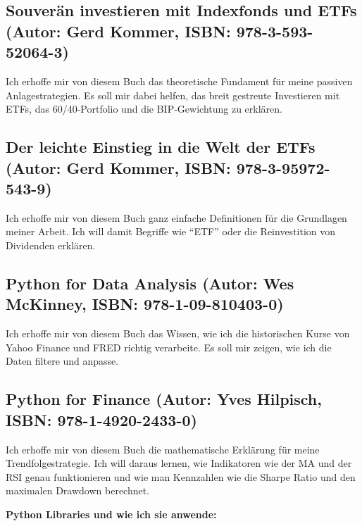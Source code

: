 \documentclass[
  ngerman,
  a4paper,
  DIV=11,
  oneside]{scrreprt}
\begin{document}
\subsection{Souverän investieren mit Indexfonds und ETFs (Autor: Gerd
Kommer, ISBN:
978-3-593-52064-3)}\label{souveruxe4n-investieren-mit-indexfonds-und-etfs-autor-gerd-kommer-isbn-978-3-593-52064-3}

Ich erhoffe mir von diesem Buch das theoretische Fundament für meine
passiven Anlagestrategien. Es soll mir dabei helfen, das breit gestreute
Investieren mit ETFs, das 60/40-Portfolio und die BIP-Gewichtung zu
erklären.

\subsection{Der leichte Einstieg in die Welt der ETFs (Autor: Gerd
Kommer, ISBN:
978-3-95972-543-9)}\label{der-leichte-einstieg-in-die-welt-der-etfs-autor-gerd-kommer-isbn-978-3-95972-543-9}

Ich erhoffe mir von diesem Buch ganz einfache Definitionen für die
Grundlagen meiner Arbeit. Ich will damit Begriffe wie ``ETF'' oder die
Reinvestition von Dividenden erklären.

\subsection{Python for Data Analysis (Autor: Wes McKinney, ISBN:
978-1-09-810403-0)}\label{python-for-data-analysis-autor-wes-mckinney-isbn-978-1-09-810403-0}

Ich erhoffe mir von diesem Buch das Wissen, wie ich die historischen
Kurse von Yahoo Finance und FRED richtig verarbeite. Es soll mir zeigen,
wie ich die Daten filtere und anpasse.

\subsection{Python for Finance (Autor: Yves Hilpisch, ISBN:
978-1-4920-2433-0)}\label{python-for-finance-autor-yves-hilpisch-isbn-978-1-4920-2433-0}

Ich erhoffe mir von diesem Buch die mathematische Erklärung für meine
Trendfolgestrategie. Ich will daraus lernen, wie Indikatoren wie der MA
und der RSI genau funktionieren und wie man Kennzahlen wie die Sharpe
Ratio und den maximalen Drawdown berechnet.

\textbf{Python Libraries und wie ich sie anwende:}
\end{document}
